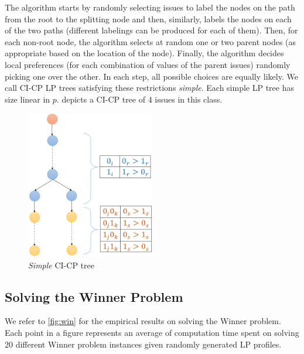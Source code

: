 The algorithm starts by randomly selecting issues to label the nodes on 
the path from the root to the splitting node and then, similarly, labels 
the nodes on each of the two paths (different labelings can be produced
for each of them). Then, for each non-root node, the algorithm selects at random
one or two parent nodes (as appropriate based on the location of the node).
Finally, the algorithm decides 
local preferences (for each combination of values of the parent issues)
randomly picking one over the other. In each step, all 
possible choices are equally likely. We call CI-CP LP trees satisfying 
these restrictions \emph{simple}. Each simple LP tree has size 
linear in $p$.   depicts a CI-CP tree of 
4 issues in this class. 
\begin{figure}
\centering
	\includegraphics[width=0.5\textwidth]{img/simple_LP_tree.png}
\caption{\emph{Simple} CI-CP tree}
\label{fig:MSCICP_tree}
\end{figure}



\subsection{Solving the Winner Problem}

We refer to \ref{fig:win} for the empirical results on solving the Winner problem.  
Each point in a figure represents
an average of computation time spent on solving 20 different 
Winner problem instances given randomly
generated LP profiles.

